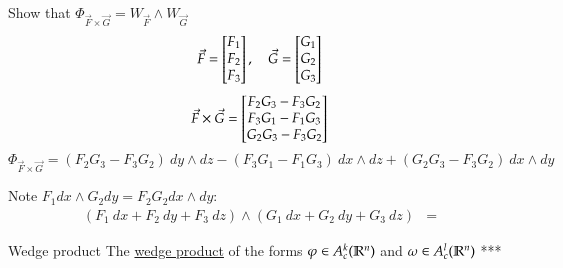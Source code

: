  Show that $\Phi_{\vec{F}\times \vec{G}}=W_{\vec{F}}\land W_{\vec{G}}$
\[\vec{F}=\begin{bmatrix} F_1 \\ F_2 \\ F_3 \end{bmatrix}, \quad \vec{G}=\begin{bmatrix} G_1 \\ G_2 \\ G_3 \end{bmatrix}\]
\[\vec{F}\times\vec{G}=\begin{bmatrix} F_2G_3 - F_3G_2 \\ F_3G_1 - F_1 G_3 \\ G_2G_3 - F_3 G_2 \end{bmatrix}\]
\[\Phi_{\vec{F}\times \vec{G}}=(F_2G_3 - F_3G_2)\ dy\land dz - (F_3G_1 - F_1 G_3)\ dx\land dz + (G_2G_3 - F_3 G_2)\ dx\land dy\]

Note $F_1dx \wedge G_2dy \overset{}{=} F_2G_2 dx\land dy$: 
\begin{align*}
	(F_1\ dx + F_2\ dy + F_3\ dz)\wedge (G_1\ dx + G_2\ dy + G_3\ dz) &= 
\end{align*}

\begin{defn}{Wedge product}
	The \ul{wedge product} of the forms $\varphi\in A_c^k(\mathbb{R}^n)$ and $\omega \in A_c^l(\mathbb{R}^n)$ ***
\end{defn}